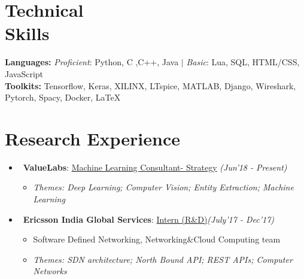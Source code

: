 \documentclass[margin,line]{templates/resume}
\newcommand{\compresslist}{%
\setlength{\itemsep}{3pt}%
\setlength{\parskip}{0pt}%
\setlength{\parsep}{0pt}%
}
\begin{document}
\begin{resume}
\section{\mysidestyle Technical\\ Skills}
\textbf{Languages:} \textit{Proficient}: Python, C ,C++, Java $|$ \textit{Basic}: Lua, SQL, HTML/CSS, JavaScript \\
\textbf{Toolkits:} Tensorflow, Keras, XILINX, LTspice, MATLAB, Django, Wireshark, Pytorch, Spacy, Docker, LaTeX

\vspace{-0.1cm}
\section{\mysidestyle Research Experience} 
\vspace{-0.01cm}
\begin{itemize}[leftmargin = 0.7cm]\compresslist
\item~\textbf{ValueLabs}: \href{https://www.valuelabs.com/}{Machine Learning Consultant- Strategy} \hfill{\small\textit{(Jun'18 - Present)}} \vspace{-1mm}
\begin{itemize}[leftmargin=*]\compresslist
        \item[]\small\textit{Themes: Deep Learning; Computer Vision; Entity Extraction; Machine Learning}
    \end{itemize}
  
\item~\textbf{Ericsson India Global Services}: \href{https://www.ericsson.com/ourportfolio/digital-services-solution-areas/cloud-sdn?nav=fgb_101_0363}{Intern (R\&D)}\hfill{\small\textit{(July'17 - Dec'17)}}                                                                                             
\vspace{-1mm}
\begin{itemize}[leftmargin=*]\compresslist
    \item[]\small Software Defined Networking, Networking\&Cloud Computing team \vspace{-1mm} 
        \item[]\small\textit{Themes: SDN architecture; North Bound API; REST APIs; Computer Networks}   
    \end{itemize}


\end{itemize}
\end{resume}
\end{document}
